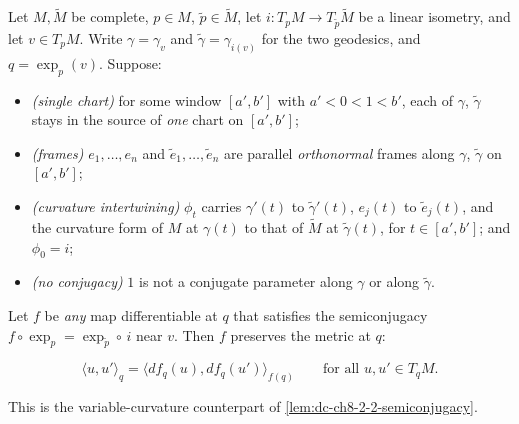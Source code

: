 \begin{lemma}
  \label{lem:dc-ch8-2-1-exp-norm-transfer-general}
  \leanok
  Let $M,\tilde M$ be complete, $p\in M$, $\tilde p\in\tilde M$, let $i:T_pM\to
  T_{\tilde p}\tilde M$ be a linear isometry, and let $v\in T_pM$. Write $\gamma=\gamma_v$
  and $\tilde\gamma=\gamma_{i(v)}$ for the two geodesics, and $q=\exp_p(v)$. Suppose:
  \begin{itemize}
    \item \emph{(single chart)} for some window $[a',b']$ with $a'<0<1<b'$, each of $\gamma$,
      $\tilde\gamma$ stays in the source of \emph{one} chart on $[a',b']$;
    \item \emph{(frames)} $e_1,\dots,e_n$ and $\tilde e_1,\dots,\tilde e_n$ are parallel
      \emph{orthonormal} frames along $\gamma$, $\tilde\gamma$ on $[a',b']$;
    \item \emph{(curvature intertwining)} $\phi_t$ carries $\gamma'(t)$ to
      $\tilde\gamma'(t)$, $e_j(t)$ to $\tilde e_j(t)$, and the curvature form of $M$ at
      $\gamma(t)$ to that of $\tilde M$ at $\tilde\gamma(t)$, for $t\in[a',b']$; and
      $\phi_0=i$;
    \item \emph{(no conjugacy)} $1$ is not a conjugate parameter along $\gamma$ or along
      $\tilde\gamma$.
  \end{itemize}
  Let $f$ be \emph{any} map differentiable at $q$ that satisfies the semiconjugacy
  $f\circ\exp_p=\exp_{\tilde p}\circ\,i$ near $v$. Then $f$ preserves the metric at $q$:

  $$
  \langle u,u'\rangle_q=\langle df_q(u),df_q(u')\rangle_{f(q)}\qquad\text{for all }u,u'\in T_qM .
  $$

  This is the variable-curvature counterpart of \cref{lem:dc-ch8-2-2-semiconjugacy}.
\end{lemma}

